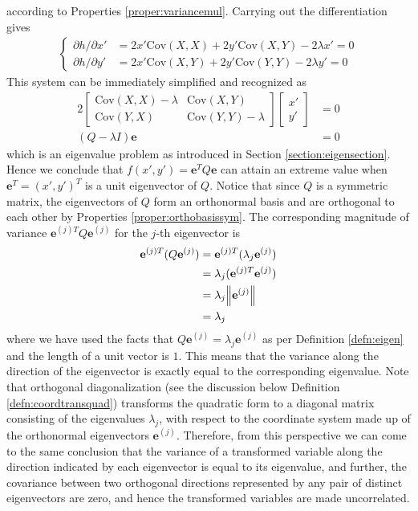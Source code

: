 according to Properties \ref{proper:variancemul}. Carrying out the differentiation gives
\begin{align*}
\begin{cases}
\partial h/\partial x' &= 2x'\text{Cov}(X, X) + 2y'\text{Cov}(X, Y) - 2\lambda x' = 0 \\
\partial h/\partial y' &= 2x'\text{Cov}(X, Y) + 2y'\text{Cov}(Y, Y) - 2\lambda y' = 0
\end{cases}    
\end{align*}
This system can be immediately simplified and recognized as
\begin{align*}
2 \begin{bmatrix}
\text{Cov}(X, X)-\lambda & \text{Cov}(X, Y) \\
\text{Cov}(Y, X) & \text{Cov}(Y, Y)-\lambda
\end{bmatrix}
\begin{bmatrix}
x' \\
y'
\end{bmatrix} &= 0\\
(Q-\lambda I)\textbf{e} &= 0
\end{align*}
which is an eigenvalue problem as introduced in Section \ref{section:eigensection}. Hence we conclude that $f(x',y') = \textbf{e}^T Q \textbf{e}$ can attain an extreme value when $\textbf{e}^T = (x',y')^T$ is a unit eigenvector of $Q$. Notice that since $Q$ is a symmetric matrix, the eigenvectors of $Q$ form an orthonormal basis and are orthogonal to each other by Properties \ref{proper:orthobasissym}. The corresponding magnitude of variance ${\textbf{e}^{(j)T}} Q \textbf{e}^{(j)}$ for the $j$-th eigenvector is
\begin{align*}
\textbf{e}^{(j)T} (Q \textbf{e}^{(j)}) &= \textbf{e}^{(j)T} (\lambda_j \textbf{e}^{(j)}) \\
&= \lambda_j (\textbf{e}^{(j)T} \textbf{e}^{(j)}) \\
&= \lambda_j \norm{\textbf{e}^{(j)}} \\
&= \lambda_j 
\end{align*}
where we have used the facts that $Q \textbf{e}^{(j)} = \lambda_j \textbf{e}^{(j)}$ as per Definition \ref{defn:eigen} and the length of a unit vector is $1$. This means that the variance along the direction of the eigenvector is exactly equal to the corresponding eigenvalue. Note that orthogonal diagonalization (see the discussion below Definition \ref{defn:coordtransquad}) transforms the quadratic form to a diagonal matrix consisting of the eigenvalues $\lambda_j$, with respect to the coordinate system made up of the orthonormal eigenvectors $\textbf{e}^{(j)}$. Therefore, from this perspective we can come to the same conclusion that the variance of a transformed variable along the direction indicated by each eigenvector is equal to its eigenvalue, and further, the covariance between two orthogonal directions represented by any pair of distinct eigenvectors are zero, and hence the transformed variables are made uncorrelated. 
